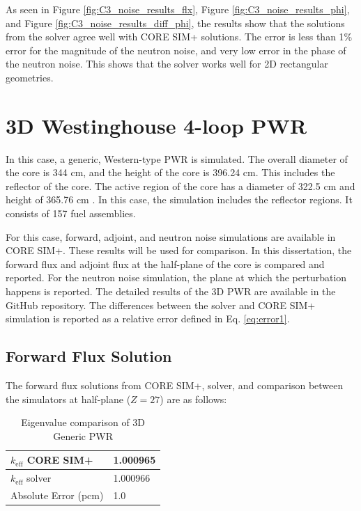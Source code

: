 As seen in Figure \ref{fig:C3_noise_results_flx}, Figure \ref{fig:C3_noise_results_phi}, and Figure \ref{fig:C3_noise_results_diff_phi}, the results show that the solutions from the solver agree well with CORE SIM+ solutions. The error is less than 1\% error for the magnitude of the neutron noise, and very low error in the phase of the neutron noise. This shows that the solver works well for 2D rectangular geometries.

\section{3D Westinghouse 4-loop PWR}

In this case, a generic, Western-type PWR is simulated. The overall diameter of the core is 344 cm, and the height of the core is 396.24 cm. This includes the reflector of the core. The active region of the core has a diameter of 322.5 cm and height of 365.76 cm \cite{husseinReactorNeutronNoise2024}. In this case, the simulation includes the reflector regions. It consists of 157 fuel assemblies.

For this case, forward, adjoint, and neutron noise simulations are available in CORE SIM+. These results will be used for comparison. In this dissertation, the forward flux and adjoint flux at the half-plane of the core is compared and reported. For the neutron noise simulation, the plane at which the perturbation happens is reported. The detailed results of the 3D PWR are available in the GitHub repository. The differences between the solver and CORE SIM+ simulation is reported as a relative error defined in Eq. \ref{eq:error1}.

\subsection{Forward Flux Solution}

The forward flux solutions from CORE SIM+, solver, and comparison between the simulators at half-plane ($Z = 27$) are as follows:

\begin{table}[H]
        \centering
        \caption{Eigenvalue comparison of 3D Generic PWR}
        \label{table:PWR3D_fw_results}
        \begin{tabular}{ | M{3.5cm} | M{2cm} | } 
         \hline
         $k_{\text{eff}}$ CORE SIM+ & 1.000965  \\
         \hline
         $k_{\text{eff}}$ solver & 1.000966  \\
         \hline
         Absolute Error (pcm) & 1.0  \\
         \hline
        \end{tabular}
\end{table}

